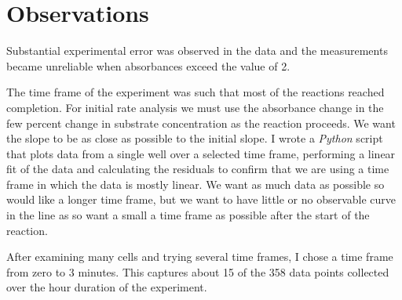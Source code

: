 \documentclass[]{tufte-handout}
\begin{document}
\section{Observations}

Substantial experimental error was observed in the data and the measurements became unreliable when absorbances exceed the value of 2. 

The time frame of the experiment was such that most of the reactions reached completion. For initial rate analysis we must use the absorbance change in the few percent change in substrate concentration as the reaction proceeds. We want the slope to be as close as possible to the initial slope. I wrote a \emph{Python} script that plots data from a single well over a selected time frame, performing a linear fit of the data and calculating the residuals to confirm that we are using a time frame in which the data is mostly linear.  We want as much data as possible so would like a longer time frame, but we want to have little or no observable curve in the line as so want a small a time frame as possible after the start of the reaction. 

After examining many cells and trying several time frames, I chose a time frame from zero to 3 minutes. This captures about 15 of the 358 data points collected over the hour duration of the experiment. 
\end{document}
